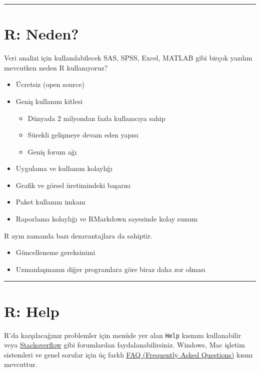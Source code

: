 \documentclass[
]{book}
\begin{document}
\begin{center}\rule{0.5\linewidth}{0.5pt}\end{center}

\hypertarget{r-neden}{%
\section{R: Neden?}\label{r-neden}}

Veri analizi için kullanılabilecek SAS, SPSS, Excel, MATLAB gibi birçok yazılım mevcutken neden R kullanıyoruz?

\begin{itemize}
\item
  Ücretsiz (open source)
\item
  Geniş kullanım kitlesi

  \begin{itemize}
  \item
    Dünyada 2 milyondan fazla kullanıcıya sahip
  \item
    Sürekli gelişmeye devam eden yapısı
  \item
    Geniş forum ağı
  \end{itemize}
\item
  Uygulama ve kullanım kolaylığı
\item
  Grafik ve görsel üretimindeki başarısı
\item
  Paket kullanım imkanı
\item
  Raporlama kolaylığı ve RMarkdown sayesinde kolay sunum
\end{itemize}

R aynı zamanda bazı dezavantajlara da sahiptir.

\begin{itemize}
\item
  Güncelleneme gereksinimi
\item
  Uzmanlaşmanın diğer programlara göre biraz daha zor olması
\end{itemize}

\begin{center}\rule{0.5\linewidth}{0.5pt}\end{center}

\hypertarget{r-help}{%
\section{R: Help}\label{r-help}}

R'da karşılacağınız problemler için menüde yer alan \texttt{Help} kısmını kullanabilir veya \href{https://stackoverflow.com/questions/tagged/r}{Stackoverflow} gibi forumlardan faydalanabilirsiniz. Windows, Mac işletim sistemleri ve genel sorular için üç farklı \href{https://cran.r-project.org/faqs.html}{FAQ (Frequently Asked Questions)} kısmı mevcuttur.
\end{document}
